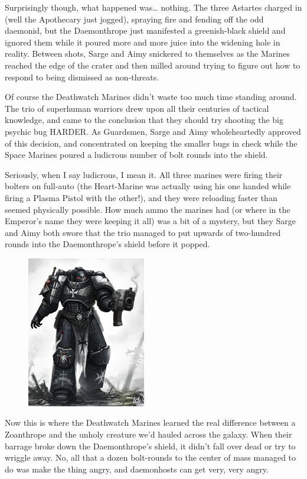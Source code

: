 Surprisingly though, what happened was… nothing. 
The three Astartes charged in (well the Apothecary just jogged), spraying fire and fending off the odd daemonid, but the Daemonthrope just manifested a greenish-black shield and ignored them while it poured more and more juice into the widening hole in reality. 
Between shots, Sarge and Aimy snickered to themselves as the Marines reached the edge of the crater and then milled around trying to figure out how to respond to being dismissed as non-threats.

Of course the Deathwatch Marines didn't waste too much time standing around. 
The trio of superhuman warriors drew upon all their centuries of tactical knowledge, and came to the conclusion that they should try shooting the big psychic bug HARDER. 
As Guardsmen, Sarge and Aimy wholeheartedly approved of this decision, and concentrated on keeping the smaller bugs in check while the Space Marines poured a ludicrous number of bolt rounds into the shield.

Seriously, when I say ludicrous, I mean it. 
All three marines were firing their bolters on full-auto (the Heart-Marine was actually using his one handed while firing a Plasma Pistol with the other!), and they were reloading faster than seemed physically possible. 
How much ammo the marines had (or where in the Emperor's name they were keeping it all) was a bit of a mystery, but they Sarge and Aimy both swore that the trio managed to put upwards of two-hundred rounds into the Daemonthrope's shield before it popped.

\begin{figure}
	\begin{center}
		\includegraphics[width=\figwidth]{pics/16/46.png}
	\end{center}
\end{figure}
Now this is where the Deathwatch Marines learned the real difference between a Zoanthrope and the unholy creature we'd hauled across the galaxy. 
When their barrage broke down the Daemonthrope's shield, it didn't fall over dead or try to wriggle away. 
No, all that a dozen bolt-rounds to the center of mass managed to do was make the thing angry, and daemonhosts can get very, very angry.

